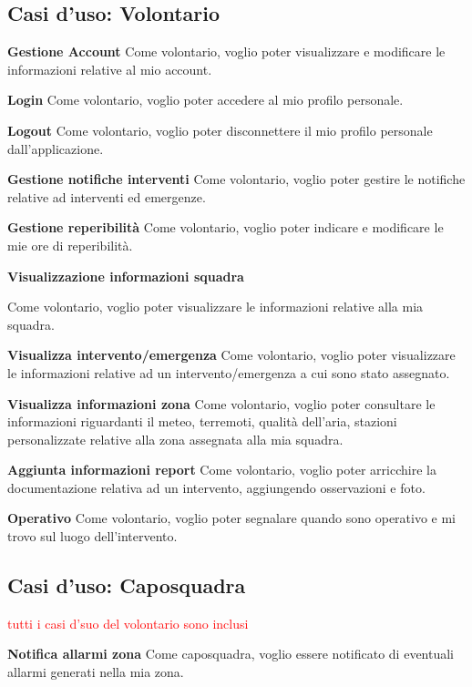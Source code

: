 \subsection{Casi d'uso: Volontario}
\textbf{Gestione Account}
Come volontario, voglio poter visualizzare e modificare le informazioni relative al mio account.

\textbf{Login}
Come volontario, voglio poter accedere al mio profilo personale.

\textbf{Logout}
Come volontario, voglio poter disconnettere il mio profilo personale dall'applicazione.

\textbf{Gestione notifiche interventi}
Come volontario, voglio poter gestire le notifiche relative ad interventi ed emergenze.

\textbf{Gestione reperibilità}
Come volontario, voglio poter indicare e modificare le mie ore di reperibilità.

\textbf{Visualizzazione informazioni squadra}

Come volontario, voglio poter visualizzare le informazioni relative alla mia squadra.

\textbf{Visualizza intervento/emergenza}
Come volontario, voglio poter visualizzare le informazioni relative ad un intervento/emergenza a cui sono stato assegnato.

\textbf{Visualizza informazioni zona}
Come volontario, voglio poter consultare le informazioni riguardanti il meteo, terremoti, qualità dell'aria, stazioni personalizzate relative alla zona assegnata alla mia squadra.

\textbf{Aggiunta informazioni report}
Come volontario, voglio poter arricchire la documentazione relativa ad un intervento, aggiungendo osservazioni e foto.

\textbf{Operativo}
Come volontario, voglio poter segnalare quando sono operativo e mi trovo sul luogo dell'intervento.


\subsection{Casi d'uso: Caposquadra}

\textcolor{red}{tutti i casi d'suo del volontario sono inclusi}

\textbf{Notifica allarmi zona}
Come caposquadra, voglio essere notificato di eventuali allarmi generati nella mia zona.

